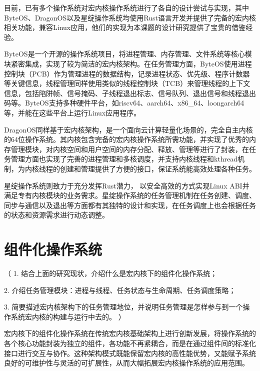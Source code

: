 目前，已有多个操作系统对宏内核操作系统进行了各自的设计尝试与实现，其中ByteOS、DragonOS以及星绽操作系统均使用Rust语言开发并提供了完备的宏内核相关功能，兼容Linux应用，他们的实现为本课题的设计研究提供了宝贵的借鉴经验。

ByteOS是一个开源的操作系统项目，将进程管理、内存管理、文件系统等核心模块紧密集成，实现了较为简洁的宏内核架构。在任务管理方面，ByteOS使用进程控制块（PCB）作为管理进程的数据结构，记录进程状态、优先级、程序计数器等关键信息，线程管理同样使用类似的线程控制块（TCB）来管理线程的上下文信息，包括陷阱帧、信号掩码、子线程退出标志、信号队列、退出信号和线程退出码等。ByteOS支持多种硬件平台，如riscv64、aarch64、x86\_64、loongarch64等，并能在这些平台上运行Linux应用程序。

DragonOS同样基于宏内核架构，是一个面向云计算轻量化场景的，完全自主内核的64位操作系统。其内核包含完备的宏内核操作系统所需功能，并实现了优秀的内存管理模块，对内核空间和用户空间的内存分配、释放、管理等进行了封装，在任务管理方面也实现了完善的进程管理和多核调度，并支持内核线程和kthread机制，为内核线程的创建和管理提供了方便的接口，保证系统能高效处理各种任务。

星绽操作系统则致力于充分发挥Rust潜力， 以安全高效的方式实现Linux ABI并满足专有内核模块的业务需求。星绽操作系统的任务管理机制在任务创建、调度、同步与通信以及退出等方面都有其独特的设计和实现，在任务调度上也会根据任务的状态和资源需求进行动态调整。



\section{组件化操作系统}

（
1. 结合上面的研究现状，介绍什么是宏内核下的组件化操作系统；

2. 介绍任务管理模块：进程与线程、任务状态与生命周期、任务调度策略；

3. 简要描述宏内核架构下的任务管理地位，并说明任务管理是怎样参与到一个操作系统宏内核的构建与运行中去的。
）

宏内核下的组件化操作系统在传统宏内核基础架构上进行创新发展，将操作系统的各个核心功能封装为独立的组件，各功能不再紧耦合，而是在通过组件间的标准化接口进行交互与协作。这种架构模式既能保留宏内核的高性能优势，又能赋予系统良好的可维护性与灵活的可扩展性，从而大幅拓展宏内核操作系统的应用范围。

